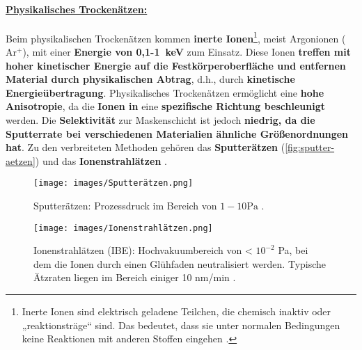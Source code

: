 \documentclass{article} %
\begin{document}
\paragraph{\uline{Physikalisches Trockenätzen:}} Beim physikalischen Trockenätzen kommen \textbf{inerte Ionen}\footnote{Inerte Ionen sind elektrisch geladene Teilchen, die chemisch inaktiv oder „reaktionsträge“ sind. Das bedeutet, dass sie unter normalen Bedingungen keine Reaktionen mit anderen Stoffen eingehen \cite{mattox2010handbook}.}, meist Argonionen (\(\mathrm{Ar^+}\)), mit einer \textbf{Energie von 0,1-1~keV} zum Einsatz. Diese Ionen \textbf{treffen mit hoher kinetischer Energie auf die Festkörperoberfläche und entfernen Material durch physikalischen Abtrag}, d.h., durch \textbf{kinetische Energieübertragung}. Physikalisches Trockenätzen ermöglicht eine \textbf{hohe Anisotropie}, da die \textbf{Ionen in} eine \textbf{spezifische Richtung beschleunigt} werden. Die \textbf{Selektivität} zur Maskenschicht ist jedoch \textbf{niedrig, da die Sputterrate bei verschiedenen Materialien ähnliche Größenordnungen hat}. Zu den verbreiteten Methoden gehören das \textbf{Sputterätzen} (\autoref{fig:sputter-aetzen}) und das \textbf{Ionenstrahlätzen} \cite{wolf2000}.

\begin{figure}[htb!]
    \centering
    \texttt{[image: images/Sputterätzen.png]} %
    \captionsetup{labelfont=bf, width=.85\textwidth} %
    \caption{Sputterätzen: Prozessdruck im Bereich von \(1-10\mathrm{Pa}\) \cite{schmid2024Aetzen}.}
    \label{fig:sputter-aetzen}
\end{figure}

\begin{figure}[htb!]
    \centering
    \texttt{[image: images/Ionenstrahlätzen.png]} %
    \captionsetup{labelfont=bf, width=.85\textwidth} %
    \caption{Ionenstrahlätzen (IBE): Hochvakuumbereich von < \(10^{-2}\) Pa, bei dem die Ionen durch einen Glühfaden neutralisiert werden. Typische Ätzraten liegen im Bereich einiger 10 nm/min \cite{schmid2024Aetzen}.}
    \label{fig:IBE-aetzen}
\end{figure}
\end{document}
